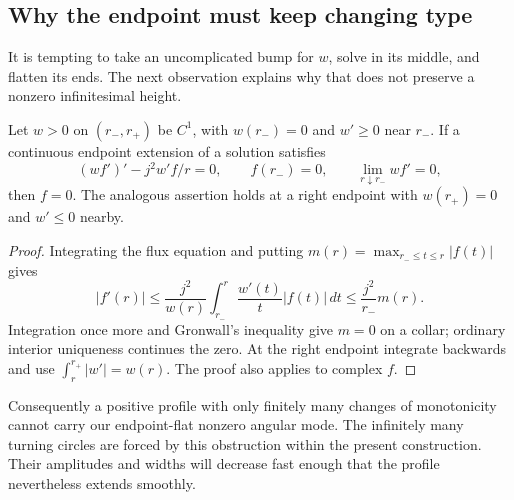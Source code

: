 \subsection{Why the endpoint must keep changing type}

It is tempting to take an uncomplicated bump for $w$, solve in its
middle, and flatten its ends. The next observation explains why
that does not preserve a nonzero infinitesimal height.

\begin{proposition}
\label{prop:obs-monotone-tail}
Let $w>0$ on $(r_-,r_+)$ be $C^1$, with $w(r_-)=0$ and $w'\ge0$
near $r_-$. If a continuous endpoint extension of a solution satisfies
\[
 (wf')'-j^2w'f/r=0,\qquad f(r_-)=0,\qquad
 \lim_{r\downarrow r_-}wf'=0,
\]
then $f=0$. The analogous assertion holds at a right endpoint with
$w(r_+)=0$ and $w'\le0$ nearby.
\end{proposition}

\begin{proof}
Integrating the flux equation and putting
$m(r)=\max_{r_-\le t\le r}|f(t)|$ gives
\[
 |f'(r)|\le \frac{j^2}{w(r)}
       \int_{r_-}^r\frac{w'(t)}t|f(t)|\,dt
 \le\frac{j^2}{r_-}m(r).
\]
Integration once more and Gronwall's inequality give $m=0$ on a
collar; ordinary interior uniqueness continues the zero. At the
right endpoint integrate backwards and use
$\int_r^{r_+}|w'|=w(r)$. The proof also applies to complex $f$.
\end{proof}

Consequently a positive profile with only finitely many changes of
monotonicity cannot carry our endpoint-flat nonzero angular mode.
The infinitely many turning circles are forced by this obstruction
within the present construction. Their amplitudes and widths will
decrease fast enough that the profile nevertheless extends smoothly.

